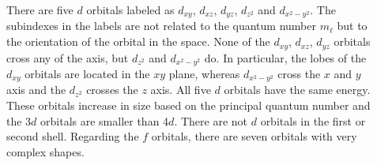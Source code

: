 \documentclass[main.tex]{subfiles}
\newcommand\chapterlabel{electrons}
\begin{document}
\begin{description}
\item[] 
There are five $d$ orbitals labeled as $d_{xy}$, $d_{xz}$, $d_{yz}$, $d_{z^2}$ and $d_{x^2-y^2}$. The subindexes in the labels are not related to the quantum number $m_\ell$ but to the orientation of the orbital in the space. None of the $d_{xy}$, $d_{xz}$, $d_{yz}$  orbitals cross any of the axis, but  $d_{z^2}$ and $d_{x^2-y^2}$ do. In particular, the lobes of the $d_{xy}$ orbitals are located in the $xy$ plane, whereas $d_{x^2-y^2}$ cross the $x$ and $y$ axis and the $d_{z^2}$ crosses the $z$ axis. All five $d$ orbitals have the same energy. These orbitals increase in size based on the principal quantum number and the 3$d$ orbitals are smaller than 4$d$. There are not $d$ orbitals in the first or second shell. Regarding the $f$ orbitals, there are seven orbitals with very complex shapes.


       \label{Fig:{\chapterlabel}\thefigurenewcounter} \begin{center}
\end{center}
\end{description}
\end{document}
